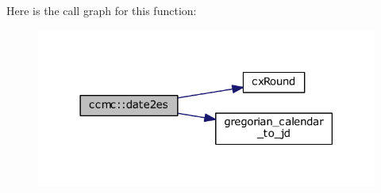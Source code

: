 Here is the call graph for this function\-:\nopagebreak
\begin{figure}[H]
\begin{center}
\leavevmode
\includegraphics[width=318pt]{namespaceccmc_a2bcda52133fe790c98ff1e09e0d8feef_cgraph}
\end{center}
\end{figure}


